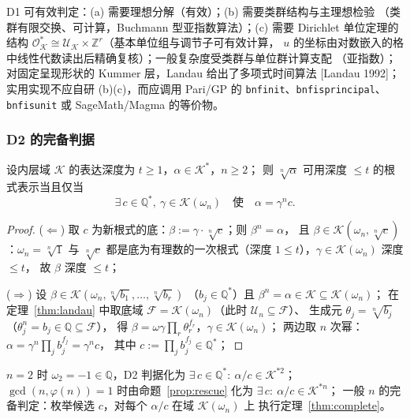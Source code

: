 \documentclass[UTF8,a4paper,11pt]{ctexart}
\begin{document}
\begin{proposition}[可判定性与复杂度]
\label{prop:decidable}
D1 可有效判定：(a) 需要理想分解（有效）；(b) 需要类群结构与主理想检验
（类群有限交换、可计算，Buchmann 型亚指数算法）；(c) 需要 Dirichlet 单位定理的结构
$\mathscr{O}_{\mathscr{K}}^*\cong\mathscr{U}_{\mathscr{K}}\times\mathbb{Z}^r$（基本单位组与调节子可有效计算，
$u$ 的坐标由对数嵌入的格中线性代数读出后精确复核）；一般复杂度受类群与单位群计算支配
（亚指数）；对固定呈现形状的 Kummer 层，Landau 给出了多项式时间算法 [Landau 1992]；
实用实现不应自研 (b)(c)，而应调用 Pari/GP 的 \texttt{bnfinit}、\texttt{bnfisprincipal}、
\texttt{bnfisunit} 或 SageMath/Magma 的等价物。
\end{proposition}

\subsubsection{D2 的完备判据}

\begin{theorem}[D2 判据]
\label{thm:d2}
设内层域 $\mathscr{K}$ 的表达深度为 $t\ge1$，$\alpha\in\mathscr{K}^*$，$n\ge2$；
则 $\sqrt[n]{\alpha}$ 可用深度 $\le t$ 的根式表示当且仅当
\[
\exists\,c\in\mathbb{Q}^*,\ \gamma\in\mathscr{K}(\omega_n)\quad\text{使}\quad
\alpha=\gamma^n c .
\]
\end{theorem}

\begin{proof}
($\Leftarrow$) 取 $c$ 为新根式的底：$\beta:=\gamma\cdot\sqrt[n]{c}$；则 $\beta^n=\alpha$，
且 $\beta\in\mathscr{K}(\omega_n,\sqrt[n]{c})$：$\omega_n=\sqrt[n]{1}$ 与 $\sqrt[n]{c}$
都是底为有理数的一次根式（深度 $1\le t$），$\gamma\in\mathscr{K}(\omega_n)$ 深度 $\le t$，
故 $\beta$ 深度 $\le t$；

($\Rightarrow$) 设 $\beta\in\mathscr{K}(\omega_n,\sqrt[n]{b_1},\dots,\sqrt[n]{b_r})$
（$b_j\in\mathbb{Q}^*$）且 $\beta^n=\alpha\in\mathscr{K}\subseteq\mathscr{K}(\omega_n)$；
在定理~\ref{thm:landau} 中取底域 $\mathscr{F}=\mathscr{K}(\omega_n)$（此时 $\mathscr{U}_n\subseteq \mathscr{F}$）、
生成元 $\theta_j=\sqrt[n]{b_j}$（$\theta_j^n=b_j\in\mathbb{Q}\subseteq \mathscr{F}$），
得 $\beta=\omega\gamma\prod_r\theta_r^{f_r}$，$\gamma\in\mathscr{K}(\omega_n)$；
两边取 $n$ 次幂：$\alpha=\gamma^n\prod_jb_j^{f_j}=\gamma^n c$，
其中 $c:=\prod_jb_j^{f_j}\in\mathbb{Q}^*$；
\end{proof}

\begin{proposition}
$n=2$ 时 $\omega_2=-1\in\mathbb{Q}$，D2 判据化为
$\exists\,c\in\mathbb{Q}^*:\ \alpha/c\in\mathscr{K}^{*2}$；
$\gcd(n,\varphi(n))=1$ 时由命题~\ref{prop:rescue} 化为
$\exists\,c:\ \alpha/c\in\mathscr{K}^{*n}$；
一般 $n$ 的完备判定：枚举候选 $c$，对每个 $\alpha/c$ 在域 $\mathscr{K}(\omega_n)$ 上
执行定理~\ref{thm:complete}。
\end{proposition}
\end{document}

